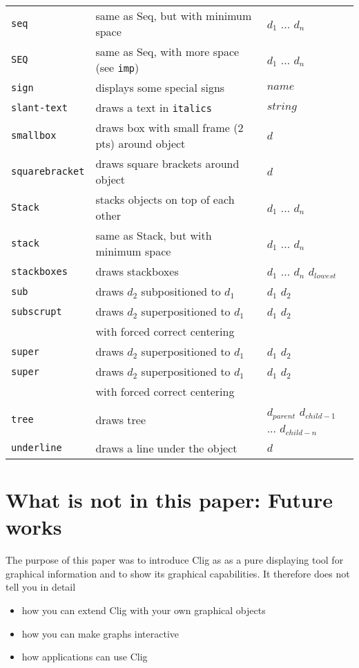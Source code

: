 \begin{center}
\begin{tabular}{l|l|l}
   {\tt seq} & same as Seq, but with minimum space & $d_1$ ... $d_n$ \\
   {\tt SEQ} & same as Seq, with more space (see {\tt imp}) &
         $d_1$ ... $d_n$ \\ 
   {\tt sign} & displays some special signs & $name$ \\
   {\tt slant-text} & draws a text in {\tt italics} & $string$ \\ 
   {\tt smallbox} & draws box with small frame (2 pts) around object &
$d$ \\
   {\tt squarebracket} & draws square brackets around object & $d$ \\
   {\tt Stack} & stacks objects on top of each other & $d_1$ ... $d_n$ \\
   {\tt stack} & same as Stack, but with minimum space & $d_1$ ...
     $d_n$ \\
   {\tt stackboxes} & draws stackboxes & $d_1$ ... $d_n$ $d_{lowest}$
\\
   {\tt sub} & draws $d_2$ subpositioned to $d_1$ & $d_1$ $d_2$ \\
    {\tt subscrupt} &  draws $d_2$ superpositioned to $d_1$ & $d_1$ $d_2$
\\ & with forced correct centering & \\

   {\tt super} &  draws $d_2$ superpositioned to $d_1$ & $d_1$ $d_2$ \\
    {\tt super} &  draws $d_2$ superpositioned to $d_1$ & $d_1$ $d_2$
\\ & with forced correct centering & \\

   {\tt tree} & draws tree & $d_{parent}$ $d_{child-1}$ ...
     $d_{child-n}$ \\
   {\tt underline} & draws a line under the object & $d$ \\
   \hline
\end{tabular}
\end{center}

\section{What is not in this paper: Future works}

The purpose of this paper was to introduce {\sf Clig} as as a pure
displaying tool for graphical information and to show its graphical
capabilities. It therefore does not tell you in detail

\begin{itemize}
\item how you can extend {\sc Clig} with your own graphical objects
\item how you can make graphs interactive
\item how applications can use {\sc Clig} 
\end{itemize}

